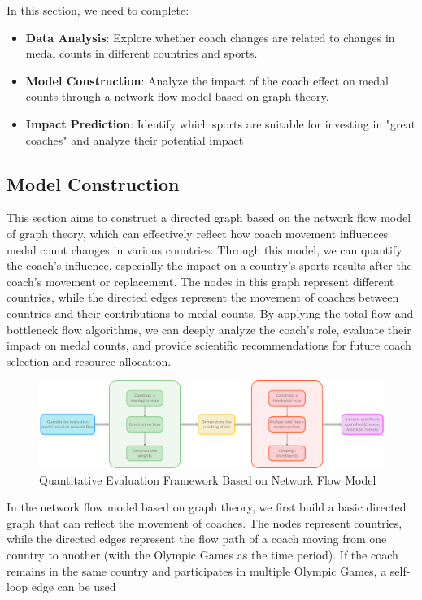\documentclass{mcmthesis}
\begin{document}
In this section, we need to complete:
\begin{itemize}
    \item 	{\bf Data Analysis}: Explore whether coach changes are related to changes in medal counts in different countries and sports.
    \item	{\bf Model Construction}: Analyze the impact of the coach effect on medal counts through a network flow model based on graph theory.
    \item	{\bf Impact Prediction}: Identify which sports are suitable for investing in "great coaches" and analyze their potential impact
\end{itemize}

\subsection{Model Construction}
This section aims to construct a directed graph based on the network flow model of graph theory, which can effectively reflect how coach movement influences medal count changes in various countries. Through this model, we can quantify the coach’s influence, especially the impact on a country’s sports results after the coach's movement or replacement. The nodes in this graph represent different countries, while the directed edges represent the movement of coaches between countries and their contributions to medal counts. By applying the total flow and bottleneck flow algorithms, we can deeply analyze the coach's role, evaluate their impact on medal counts, and provide scientific recommendations for future coach selection and resource allocation.
\begin{figure}[h]   
    \centering          
    \includegraphics[width=12cm]{graph/graphy_baseline.png}
    \caption{Quantitative Evaluation Framework Based on Network Flow Model } \label{fig1}    
\end{figure}

In the network flow model based on graph theory, we first build a basic directed graph that can reflect the movement of coaches. The nodes represent countries, while the directed edges represent the flow path of a coach moving from one country to another (with the Olympic Games as the time period). If the coach remains in the same country and participates in multiple Olympic Games, a self-loop edge can be used
\end{document}
